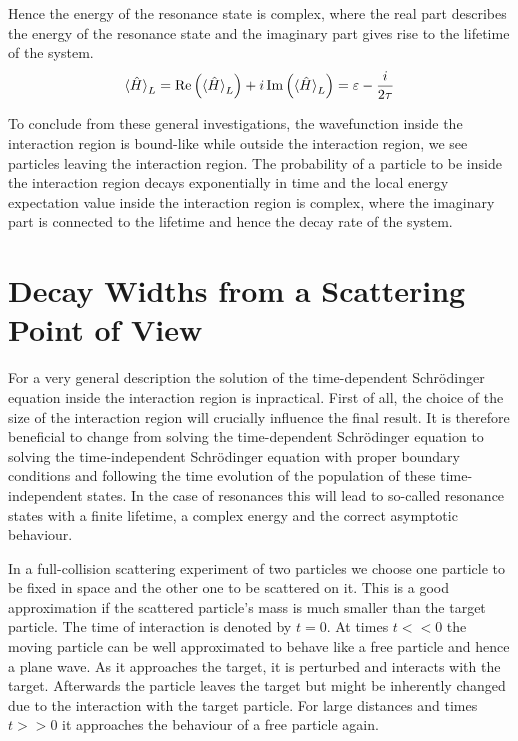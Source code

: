 Hence the energy of the resonance state is complex, where the real part
describes the energy of the resonance state and the imaginary part gives rise
to the lifetime of the system.
\begin{equation} \label{equation:expectation_H_interaction_region}
  \braket{\hat{H}}_L = \operatorname{Re} \left( \braket{\hat{H}}_L \right)
  + i \operatorname{Im} \left( \braket{\hat{H}}_L \right) = \varepsilon - \frac{i}{2\tau}
\end{equation}

To conclude from these general investigations, the wavefunction inside
the interaction region is bound-like while outside the interaction region,
we see particles leaving the interaction region. The probability of a
particle to be inside the interaction region decays exponentially in time
and the local energy expectation value inside the interaction region is complex,
where the imaginary part is connected to the lifetime and hence the decay
rate of the system.





\section{Decay Widths from a Scattering Point of View}
For a very general description the solution of the time-dependent Schrödinger
equation inside the interaction region is inpractical. First of all, the
choice of the size of the interaction region will crucially influence the
final result. It is therefore beneficial to change from solving the time-dependent
Schrödinger equation to solving the time-independent Schrödinger equation
with proper boundary conditions and following the time evolution of the population
of these time-independent states. In the case of resonances
this will lead to so-called resonance states
with a finite lifetime, a complex energy and the correct asymptotic behaviour.

In a full-collision scattering experiment of two particles we choose
one particle to be fixed in space and the other one to be scattered on it.
This is a good approximation if the scattered particle's mass is much smaller
than the target particle. The time of interaction is denoted by $t=0$.
At times $t<<0$ the moving particle can be well approximated to behave like
a free particle and hence a plane wave. As it approaches the target, it is
perturbed and interacts with the target. Afterwards the particle leaves the target
but might be inherently changed due to the interaction with the target particle.
For large distances and times $t>>0$ it approaches the behaviour of a free
particle again.

